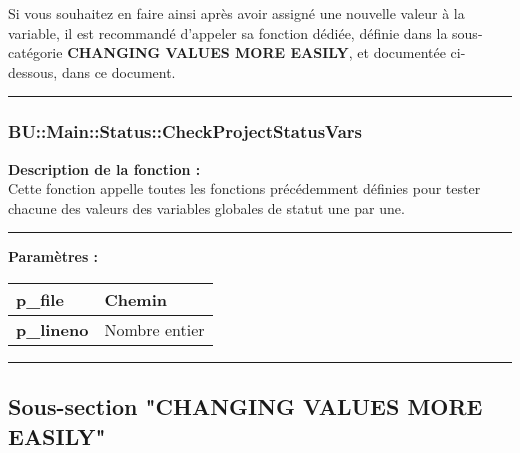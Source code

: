 \documentclass[a4paper,10pt]{article}
\begin{document}
\begin{justify}
    Si vous souhaitez en faire ainsi après avoir assigné une nouvelle valeur à la variable, il est recommandé d'appeler sa fonction dédiée, définie dans la sous-catégorie \textbf{\color{sec2}CHANGING VALUES MORE EASILY}, et documentée ci-dessous, dans ce document.
\end{justify}



\color{sec3}\par\noindent\rule{\textwidth}{0.4pt}\color{text}

\color{sec3}
\subsubsection{BU::Main::Status::CheckProjectStatusVars}\color{text}

\begin{justify}
    \textbf{Description de la fonction :}\\[1\baselineskip]
    Cette fonction appelle toutes les fonctions précédemment définies pour tester chacune des valeurs des variables globales de statut une par une.
\end{justify}


\par\noindent\rule{\textwidth}{0.4pt}

\begin{justify}
    \textbf{Paramètres :}\\[1\baselineskip]
    \begin{tabular}{|l|l|}
        \hline
        \textbf{\color{vars}p\_file} & Chemin\\
        \hline
        \textbf{\color{vars}p\_lineno} & Nombre entier\\
        \hline
    \end{tabular}
\end{justify}

\setlength{\parskip}{2em}




\color{sec2}\par\noindent\rule{\textwidth}{0.4pt}\color{text}

\color{sec2}
\subsection{Sous-section "CHANGING VALUES MORE EASILY"}\color{text}
\end{document}

